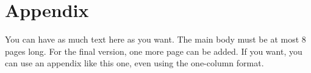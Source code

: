 \documentclass[nohyperref]{article}
\theoremstyle{plain}
\theoremstyle{definition}
\theoremstyle{remark}
\begin{document}
\section{Appendix}

You can have as much text here as you want. The main body must be at most $8$ pages long.
For the final version, one more page can be added.
If you want, you can use an appendix like this one, even using the one-column format.
\end{document}
